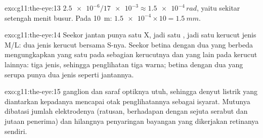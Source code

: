 \begin{solution}{exo:g11:the-eye:13}
$\num{2.5e-6}/\num{17e-3} \approx \num{1.5e-4}\,\unit{rad}$, yaitu
sekitar setengah menit busur. Pada \qty{10}{m}: $\num{1.5e-4} \times 10 =
\qty{1.5}{mm}$.
\end{solution}

\begin{solution}{exo:g11:the-eye:14}
Seekor jantan punya satu X, jadi satu , jadi satu kerucut jenis
M/L: dua jenis kerucut bersama S-nya. Seekor betina dengan dua 
yang berbeda mengungkapkan yang satu pada sebagian kerucutnya dan yang
lain pada kerucut lainnya: tiga jenis, sehingga penglihatan tiga warna;
betina dengan dua  yang serupa punya dua jenis seperti jantannya.
\end{solution}

\begin{solution}{exo:g11:the-eye:15}
 ganglion dan saraf optiknya utuh, sehingga denyut listrik yang
diantarkan kepadanya mencapai otak penglihatannya sebagai isyarat.
Mutunya dibatasi jumlah elektrodenya (ratusan, berhadapan dengan
sejuta serabut dan jutaan  penerima) dan hilangnya penyaringan
bayangan yang dikerjakan retinanya sendiri.
\end{solution}

